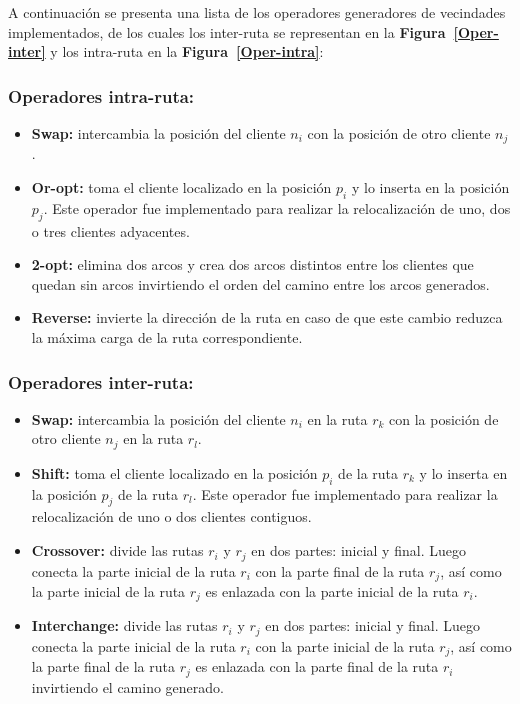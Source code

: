 A continuación se presenta una lista de los operadores generadores de vecindades implementados, de los cuales los inter-ruta se representan en la \textbf{Figura~\ref{Oper-inter}} y los intra-ruta en la \textbf{Figura~\ref{Oper-intra}}:

\subsubsection*{Operadores intra-ruta:}
\begin{itemize}
\item \textbf{Swap:} intercambia la posición del cliente $n_i$ con la posición de otro cliente $n_j$.
\item \textbf{Or-opt:} toma el cliente localizado en la posición $p_i$ y lo inserta en la posición $p_j$. Este operador fue im\-ple\-men\-ta\-do para realizar la relocalización de uno, dos o tres clientes adyacentes.
\item \textbf{2-opt:} elimina dos arcos y crea dos arcos distintos entre los clientes que quedan sin arcos invirtiendo el orden del camino entre los arcos generados. 
\item \textbf{Reverse:} invierte la dirección de la ruta en caso de que este cambio reduzca la máxima carga de la ruta correspondiente.
\end{itemize}

\subsubsection*{Operadores inter-ruta:}
\begin{itemize}
\item \textbf{Swap:} intercambia la posición del cliente $n_i$ en la ruta $r_k$ con la posición de otro cliente $n_j$ en la ruta $r_l$.
\item \textbf{Shift:} toma el cliente localizado en la posición $p_i$ de la ruta $r_k$ y lo inserta en la posición $p_j$ de la ruta $r_l$. Este operador fue implementado para realizar la relocalización de uno o dos clientes contiguos.
\item \textbf{Crossover:} divide las rutas $r_i$ y $r_j$ en dos partes: inicial y final. Luego conecta la parte inicial de la ruta $r_i$ con la parte final de la ruta $r_j$, así como la parte inicial de la ruta $r_j$ es enlazada con la parte inicial de la ruta $r_i$.
\item \textbf{Interchange:} divide las rutas $r_i$ y $r_j$ en dos partes: inicial y final. Luego conecta la parte inicial de la ruta $r_i$ con la parte inicial de la ruta $r_j$, así como la parte final de la ruta $r_j$ es enlazada con la parte final de la ruta $r_i$ invirtiendo el camino generado.
\end{itemize}

